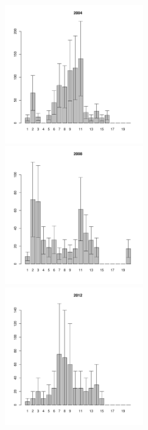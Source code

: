 \documentclass[12pt, a4paper]{article}
\begin{document}
\begin{figure}[h]

\begin{multicols}{3}
\hfill
\includegraphics[width=60mm]{../White_Sea/Luvenga_Goreliy/low_2004_.pdf}
\hfill
\includegraphics[width=60mm]{../White_Sea/Luvenga_Goreliy/low_2008_.pdf}
\hfill
\includegraphics[width=60mm]{../White_Sea/Luvenga_Goreliy/low_2012_.pdf}
\end{multicols}




\end{figure}
\end{document}
